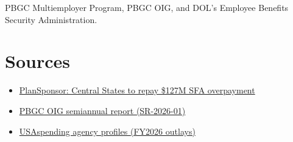 \documentclass[letterpaper,11pt]{article}
\providecommand{\tightlist}{\setlength{\itemsep}{0pt}\setlength{\parskip}{0pt}}
\begin{document}
PBGC Multiemployer Program, PBGC OIG, and DOL's Employee Benefits
Security Administration.

\hypertarget{sources}{%
\section{Sources}\label{sources}}

\begin{itemize}
\tightlist
\item
  \href{https://www.plansponsor.com/pbgc-says-central-states-will-reimburse-sfa-overpayment/}{PlanSponsor:
  Central States to repay \$127M SFA overpayment}
\item
  \href{https://oig.pbgc.gov/pdfs/SR-2026-01.pdf}{PBGC OIG semiannual
  report (SR-2026-01)}
\item
  \href{https://www.usaspending.gov/agency}{USAspending agency profiles
  (FY2026 outlays)}
\end{itemize}
\end{document}
